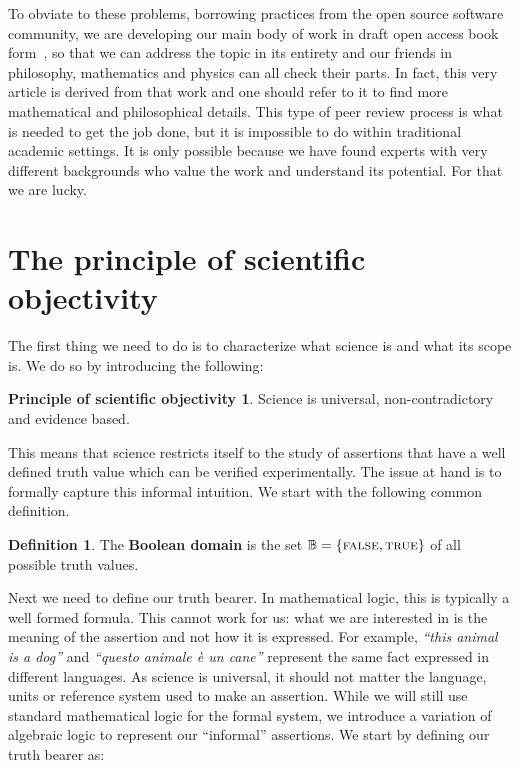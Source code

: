 \documentclass[letterpaper]{article}
\theoremstyle{plain}%
\theoremstyle{definition}
\newtheorem{defn}[thrm]{Definition}
\newtheorem*{principle*}{Principle of scientific objectivity}
\theoremstyle{remark}
\numberwithin{equation}{section}
\def\TRUE{\textsc{true}}
\def\FALSE{\textsc{false}}
\newcommand{\statement}[1] {\emph{``#1''}}
\begin{document}
To obviate to these problems, borrowing practices from the open source software community, we are developing our main body of work in draft open access book form~\cite{Carc3}, so that we can address the topic in its entirety and our friends in philosophy, mathematics and physics can all check their parts. In fact, this very article is derived from that work and one should refer to it to find more mathematical and philosophical details. This type of peer review process is what is needed to get the job done, but it is impossible to do within traditional academic settings. It is only possible because we have found experts with very different backgrounds who value the work and understand its potential. For that we are lucky.


\section{The principle of scientific objectivity}

The first thing we need to do is to characterize what science is and what its scope is. We do so by introducing the following:

\begin{principle*}
Science is universal, non-contradictory and evidence based.
\end{principle*}

This means that science restricts itself to the study of assertions that have a well defined truth value which can be verified experimentally. The issue at hand is to formally capture this informal intuition. We start with the following common definition.

\begin{defn}
	The \textbf{Boolean domain} is the set $\mathbb{B} = \{\FALSE, \TRUE\}$ of all possible truth values.
\end{defn}

Next we need to define our truth bearer. In mathematical logic, this is typically a well formed formula. This cannot work for us: what we are interested in is the meaning of the assertion and not how it is expressed. For example, \statement{this animal is a dog} and \statement{questo animale \`e un cane} represent the same fact expressed in different languages. As science is universal, it should not matter the language, units or reference system used to make an assertion. While we will still use standard mathematical logic for the formal system, we introduce a variation of algebraic logic to represent our ``informal'' assertions. We start by defining our truth bearer as:
\end{document}
